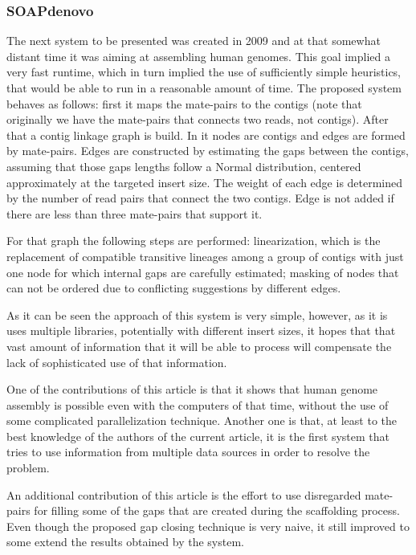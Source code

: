 \documentclass[11pt]{article}
\begin{document}
\subsubsection{SOAPdenovo} %
\label{ssub:SOAPdenovo}
The next system to be presented \cite{SOAPdenovo} was created in 2009 and at
that somewhat distant time it was aiming at assembling human genomes. This goal
implied a very fast runtime, which in turn implied the use of sufficiently
simple heuristics, that would be able to run in a reasonable amount of time. The
proposed system behaves as follows: first it maps the mate-pairs to the contigs
(note that originally we have the mate-pairs that connects two reads, not
contigs). After that a contig linkage graph is build. In it nodes are contigs
and edges are formed by mate-pairs. Edges are constructed by estimating the gaps
between the contigs, assuming that those gaps lengths follow a Normal
distribution, centered approximately at the targeted insert size. The weight of
each edge is determined by the number of read pairs that connect the two
contigs. Edge is not added if there are less than three mate-pairs that support
it.

For that graph the following steps are performed: linearization, which is the
replacement of compatible transitive lineages among a group of contigs with just
one node for which internal gaps are carefully estimated; masking of nodes that
can not be ordered due to conflicting suggestions by different edges.

As it can be seen the approach of this system is very simple, however, as it is
uses multiple libraries, potentially with different insert sizes, it hopes that
that vast amount of information that it will be able to process will compensate
the lack of sophisticated use of that information.

One of the contributions of this article is that it shows that human genome
assembly is possible even with the computers of that time, without the use of
some complicated parallelization technique. Another one is that, at least to the
best knowledge of the authors of the current article, it is the first system
that tries to use information from multiple data sources in order to resolve the
problem.

An additional contribution of this article is the effort to use disregarded
mate-pairs for filling some of the gaps that are created during the scaffolding
process. Even though the proposed gap closing technique is very naive, it still
improved to some extend the results obtained by the system.
\end{document}
